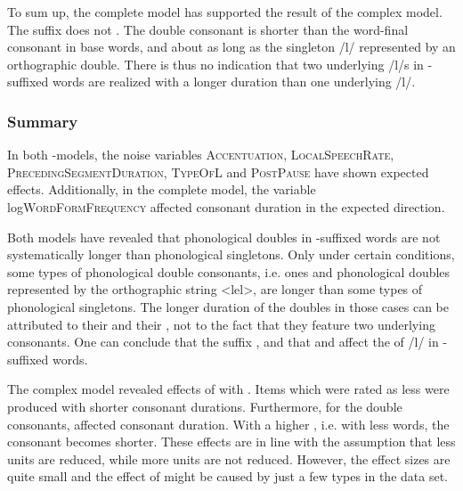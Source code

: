 To sum up, the complete model has supported the result of the complex model. The suffix  does not . The double consonant is shorter than the word-final consonant in base words, and about as long as the singleton /l/ represented by an orthographic double. There is thus no indication that two underlying /l/s in -suffixed words are realized with a longer duration than one underlying /l/.




\subsubsection{Summary} \label{ly experiment summary}

In both -models, the noise variables \textsc{Accentuation}, \textsc{LocalSpeechRate}, \textsc{PrecedingSegmentDuration}, \textsc{TypeOfL} and \textsc{PostPause} have shown expected effects. Additionally, in the complete model, the variable log\textsc{WordFormFrequency} affected consonant duration in the expected direction.

Both models have revealed that phonological doubles in -suffixed words are not systematically longer than phonological singletons. Only under certain conditions, some types of phonological double consonants, i.e.  ones and phonological doubles represented by the orthographic string <lel>, are longer than some types of phonological singletons. The longer duration of the doubles in those cases can be attributed to their  and their , not to the fact that they feature two underlying consonants. %
One can conclude that the suffix  , and that  and  affect the  of /l/ in -suffixed words. %

The complex model revealed effects of  with . Items which were rated as less  were produced with shorter consonant durations. Furthermore, for the  double consonants,  affected consonant duration. With a higher , i.e. with less  words, the consonant becomes shorter. 
These effects are in line with the assumption that less  units are reduced, while more  units are not reduced. However, the effect sizes are quite small and the effect of  might be caused by just a few types in the data set. 

